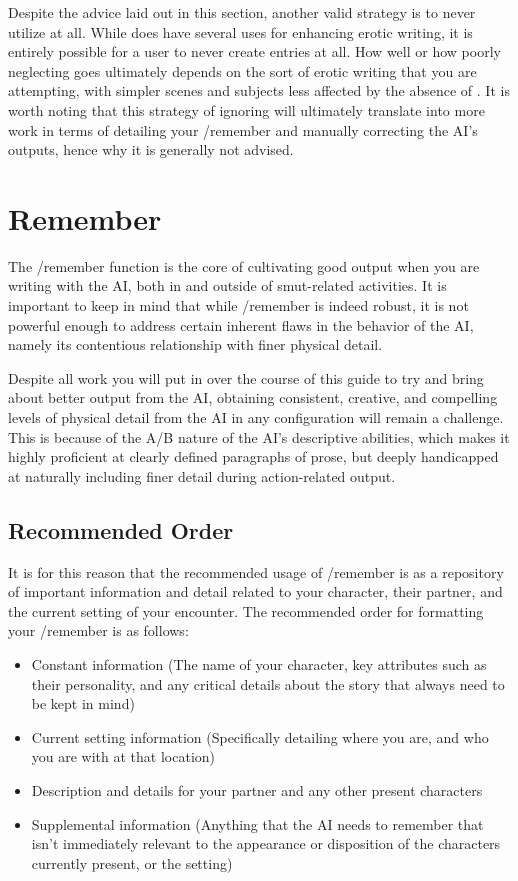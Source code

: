 \documentclass[Source-main.tex]{subfiles}
\begin{document}
Despite the advice laid out in this section, another valid strategy is to never utilize \wi at all.
While \wi does have several uses for enhancing erotic writing, it is entirely possible for a user to never create \wi entries at all.
How well or how poorly neglecting \wi goes ultimately depends on the sort of erotic writing that you are attempting, with simpler scenes and subjects less affected by the absence of \wi.
It is worth noting that this strategy of ignoring \wi will ultimately translate into more work in terms of detailing your /remember and manually correcting the AI’s outputs, hence why it is generally not advised.

\chapter{Remember}
\label{ch:remember}

The /remember function is the core of cultivating good output when you are writing with the AI, both in and outside of smut-related activities.
It is important to keep in mind that while /remember is indeed robust, it is not powerful enough to address certain inherent flaws in the behavior of the AI, namely its contentious relationship with finer physical detail.

Despite all work you will put in over the course of this guide to try and bring about better output from the AI, obtaining consistent, creative, and compelling levels of physical detail from the AI in any configuration will remain a challenge.
This is because of the A/B nature of the AI’s descriptive abilities, which makes it highly proficient at clearly defined paragraphs of prose, but deeply handicapped at naturally including finer detail during action-related output.

\section{Recommended Order}
\label{sec:recomorder}

It is for this reason that the recommended usage of /remember is as a repository of important information and detail related to your character, their partner, and the current setting of your encounter.
The recommended order for formatting your /remember is as follows:

\begin{itemize}

\item{Constant information (The name of your character, key attributes such as their personality, and any critical details about the story that always need to be kept in mind)}
\item{Current setting information (Specifically detailing where you are, and who you are with at that location)}
\item{Description and details for your partner and any other present characters}
\item{Supplemental information (Anything that the AI needs to remember that isn’t immediately relevant to the appearance or disposition of the characters currently present, or the setting)}

\end{itemize}
\end{document}
